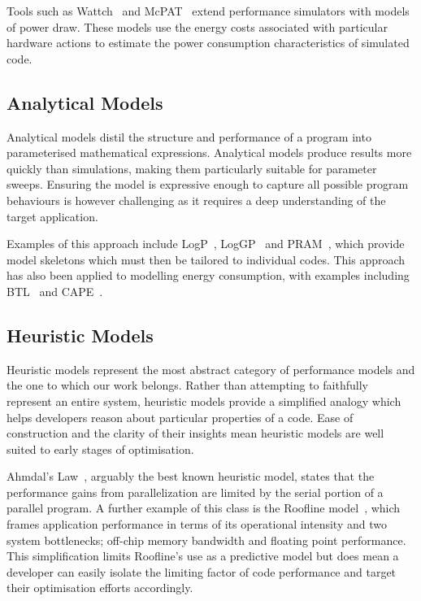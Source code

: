 Tools such as Wattch~\cite{brooks:2000aa} and McPAT~\cite{li:2009aa} extend performance simulators with models of power draw.
These models use the energy costs associated with particular hardware actions to estimate the power consumption characteristics of simulated code.

\subsection{Analytical Models} 
Analytical models distil the structure and performance of a program into parameterised mathematical expressions.
Analytical models produce results more quickly than simulations, making them particularly suitable for parameter sweeps.
Ensuring the model is expressive enough to capture all possible program behaviours is however challenging as it requires a deep understanding of the target application.

Examples of this approach include LogP~\cite{culler:1993aa}, LogGP~\cite{alexandrov:1997aa} and PRAM~\cite{karp:1991aa}, which provide model skeletons which must then be tailored to individual codes.
This approach has also been applied to modelling energy consumption, with examples including BTL~\cite{manousakis:2012aa} and CAPE~\cite{kamble:1997aa}.

\subsection{Heuristic Models}
Heuristic models represent the most abstract category of performance models and the one to which our work belongs.
Rather than attempting to faithfully represent an entire system, heuristic models provide a simplified analogy which helps developers reason about particular properties of a code.
Ease of construction and the clarity of their insights mean heuristic models are well suited to early stages of optimisation.

Ahmdal's Law~\cite{amdahl:1967aa}, arguably the best known heuristic model, states that the performance gains from parallelization are limited by the serial portion of a parallel program.
A further example of this class is the Roofline model~\cite{williams:2009aa}, which frames application performance in terms of its operational intensity and two system bottlenecks; off-chip memory bandwidth and floating point performance.
This simplification limits Roofline's use as a predictive model but does mean a developer can easily isolate the limiting factor of code performance and target their optimisation efforts accordingly.

